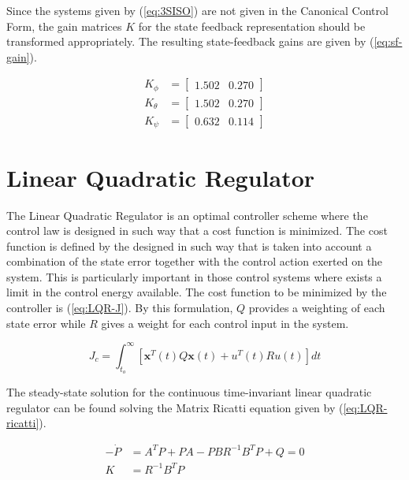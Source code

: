 \documentclass[12pt]{article}
\begin{document}
Since the systems given by (\ref{eq:3SISO}) are not given in the Canonical Control Form, the gain matrices $K$ for the state feedback representation should be transformed appropriately. The resulting state-feedback gains are given by (\ref{eq:sf-gain}). 

\begin{equation}
  \label{eq:sf-gain}
  \begin{split}
    K_\phi   &= \begin{bmatrix} 1.502 & 0.270 \end{bmatrix} \\
    K_\theta &= \begin{bmatrix} 1.502 & 0.270 \end{bmatrix} \\
    K_\psi   &= \begin{bmatrix} 0.632 & 0.114 \end{bmatrix}
  \end{split}
\end{equation}

\section{Linear Quadratic Regulator}

The Linear Quadratic Regulator is an optimal controller scheme where the control law is designed in such way that a cost function is minimized. The cost function is defined by the designed in such way that is taken into account a combination of the state error together with the control action exerted on the system. This is particularly important in those control systems where exists a limit in the control energy available. The cost function to be minimized by the controller is (\ref{eq:LQR-J}). By this formulation, $Q$ provides a weighting of each state error while $R$ gives a weight for each control input in the system.

\begin{equation}
  \label{eq:LQR-J}
  J_c = \int_{t_o}^{\infty}  \left [ \mathbf{x}^T(t) Q \mathbf{x}(t) + u^T(t) R u(t) \right ] dt
\end{equation}

The steady-state solution for the continuous time-invariant linear quadratic regulator can be found solving the Matrix Ricatti equation given by (\ref{eq:LQR-ricatti}).

\begin{equation}
  \label{eq:LQR-ricatti}
  \begin{split}
    -\dot{P} &= A^T P + P A - PBR^{-1}B^TP + Q = 0 \\
    K &= R^{-1} B^T P
  \end{split}
\end{equation}
\end{document}
